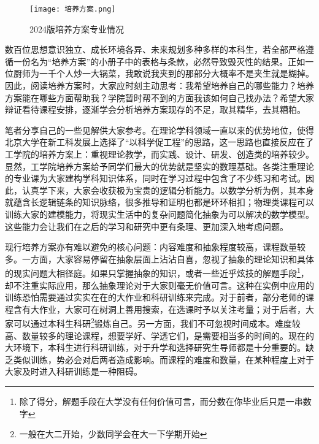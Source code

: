 \documentclass[11pt,oneside]{book}
\begin{document}
\begin{figure}[htbp]
  \centering
	\texttt{[image: 培养方案.png]}
	\renewcommand{\figurename}{图}
	\caption{2024版培养方案专业情况}
	\label{fig:enter-label}
\end{figure}


\vspace{10pt}

数百位思想意识独立、成长环境各异、未来规划多种多样的本科生，若全部严格遵循一份名为“培养方案”的小册子中的表格与条款，必然导致毁灭性的结果。正如一位厨师为一千个人炒一大锅菜，我敢说我夹到的那部分大概率不是夹生就是糊掉。因此，阅读培养方案时，大家应时刻主动思考：我希望培养自己的哪些能力？培养方案能在哪些方面帮助我？学院暂时帮不到的方面我该如何自己找办法？希望大家辩证看待课程安排，逐渐学会分析培养方案现存的不足，取其精华，去其糟粕。

\vspace{10pt}

笔者分享自己的一些见解供大家参考。在理论学科领域一直以来的优势地位，使得北京大学在新工科发展上选择了“以科学促工程”的思路，这一思路也直接反应在了工学院的培养方案上：重视理论教学，而实践、设计、研发、创造类的培养较少。显然，工学院培养方案给予同学们最大的优势就是坚实的数理基础。各类注重理论的专业课为大家建构学科知识体系，同时在学习过程中包含了不少练习和考试。因此，认真学下来，大家会收获极为宝贵的逻辑分析能力。以数学分析为例，其本身就蕴含长逻辑链条的知识脉络，很多推导和证明也都是环环相扣；物理类课程可以训练大家的建模能力，将现实生活中的复杂问题简化抽象为可以解决的数学模型。这些能力会让我们在之后的学习和研究中更有条理、更加深入地考虑问题。

\vspace{10pt}

现行培养方案亦有难以避免的核心问题：内容难度和抽象程度较高，课程数量较多。一方面，大家容易停留在抽象层面上沾沾自喜，忽视了抽象的理论知识和具体的现实问题大相径庭。如果只掌握抽象的知识，或者一些近乎炫技的解题手段\footnote{除了得分，解题手段在大学没有任何价值可言，而分数在你毕业后只是一串数字}，却不注重实际应用，那么抽象理论对于大家则毫无价值可言。这种在实例中应用的训练恐怕需要通过实实在在的大作业和科研训练来完成。对于前者，部分老师的课程含有大作业，大家可在树洞上善用搜索，在选课时予以关注考量；对于后者，大家可以通过本科生科研\footnote{一般在大二开始，少数同学会在大一下学期开始}锻炼自己。另一方面，我们不可忽视时间成本。难度较高、数量较多的理论课程，想要学好、学透它们，是需要相当多的时间的。现在的大环境下，本科生进行科研训练，对于升学和选择研究生导师都是十分重要的。缺乏类似训练，势必会对后两者造成影响。而课程的难度和数量，在某种程度上对于大家及时进入科研训练是一种阻碍。
\end{document}
